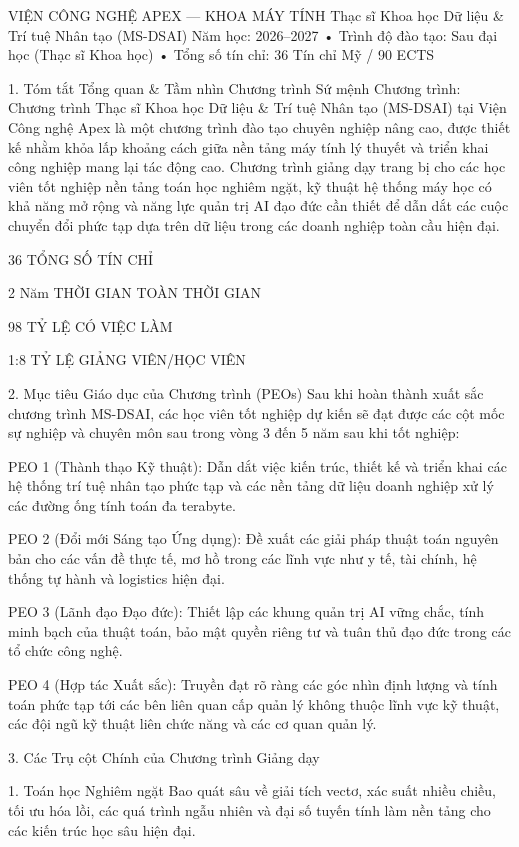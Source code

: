 VIỆN CÔNG NGHỆ APEX — KHOA MÁY TÍNH
Thạc sĩ Khoa học Dữ liệu & Trí tuệ Nhân tạo (MS-DSAI)
Năm học: 2026–2027
• Trình độ đào tạo: Sau đại học (Thạc sĩ Khoa học)
• Tổng số tín chỉ: 36 Tín chỉ Mỹ / 90 ECTS

1. Tóm tắt Tổng quan & Tầm nhìn Chương trình
Sứ mệnh Chương trình: Chương trình Thạc sĩ Khoa học Dữ liệu & Trí tuệ Nhân tạo (MS-DSAI) tại Viện Công nghệ Apex là một chương trình đào tạo chuyên nghiệp nâng cao, được thiết kế nhằm khỏa lấp khoảng cách giữa nền tảng máy tính lý thuyết và triển khai công nghiệp mang lại tác động cao. Chương trình giảng dạy trang bị cho các học viên tốt nghiệp nền tảng toán học nghiêm ngặt, kỹ thuật hệ thống máy học có khả năng mở rộng và năng lực quản trị AI đạo đức cần thiết để dẫn dắt các cuộc chuyển đổi phức tạp dựa trên dữ liệu trong các doanh nghiệp toàn cầu hiện đại.

36
TỔNG SỐ TÍN CHỈ

2 Năm
THỜI GIAN TOÀN THỜI GIAN

98%
TỶ LỆ CÓ VIỆC LÀM

1:8
TỶ LỆ GIẢNG VIÊN/HỌC VIÊN

2. Mục tiêu Giáo dục của Chương trình (PEOs)
Sau khi hoàn thành xuất sắc chương trình MS-DSAI, các học viên tốt nghiệp dự kiến sẽ đạt được các cột mốc sự nghiệp và chuyên môn sau trong vòng 3 đến 5 năm sau khi tốt nghiệp:

PEO 1 (Thành thạo Kỹ thuật): Dẫn dắt việc kiến trúc, thiết kế và triển khai các hệ thống trí tuệ nhân tạo phức tạp và các nền tảng dữ liệu doanh nghiệp xử lý các đường ống tính toán đa terabyte.

PEO 2 (Đổi mới Sáng tạo Ứng dụng): Đề xuất các giải pháp thuật toán nguyên bản cho các vấn đề thực tế, mơ hồ trong các lĩnh vực như y tế, tài chính, hệ thống tự hành và logistics hiện đại.

PEO 3 (Lãnh đạo Đạo đức): Thiết lập các khung quản trị AI vững chắc, tính minh bạch của thuật toán, bảo mật quyền riêng tư và tuân thủ đạo đức trong các tổ chức công nghệ.

PEO 4 (Hợp tác Xuất sắc): Truyền đạt rõ ràng các góc nhìn định lượng và tính toán phức tạp tới các bên liên quan cấp quản lý không thuộc lĩnh vực kỹ thuật, các đội ngũ kỹ thuật liên chức năng và các cơ quan quản lý.

3. Các Trụ cột Chính của Chương trình Giảng dạy

1. Toán học Nghiêm ngặt
Bao quát sâu về giải tích vectơ, xác suất nhiều chiều, tối ưu hóa lồi, các quá trình ngẫu nhiên và đại số tuyến tính làm nền tảng cho các kiến trúc học sâu hiện đại.


